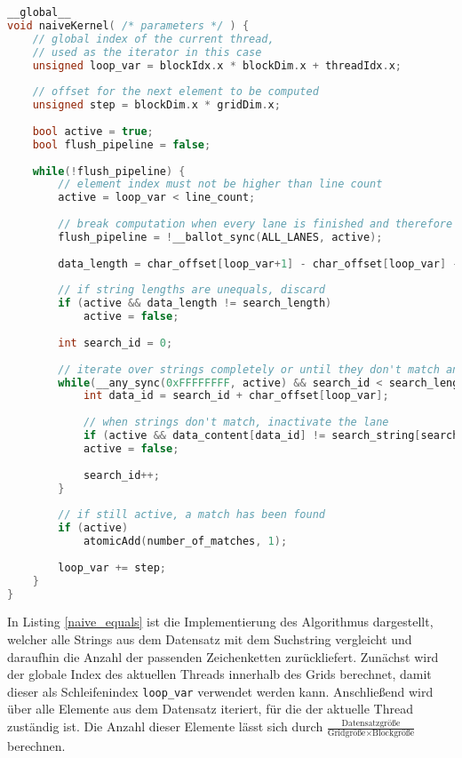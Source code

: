 \begin{lstlisting}[language=C++,
	caption=Naive Implementierung des String-Vergleichs,
	label=naive_equals]
__global__
void naiveKernel( /* parameters */ ) {
	// global index of the current thread,
	// used as the iterator in this case
	unsigned loop_var = blockIdx.x * blockDim.x + threadIdx.x;
	
	// offset for the next element to be computed
	unsigned step = blockDim.x * gridDim.x;
	
	bool active = true;
	bool flush_pipeline = false;
	
	while(!flush_pipeline) {
		// element index must not be higher than line count
		active = loop_var < line_count;
		
		// break computation when every lane is finished and therefore inactive
		flush_pipeline = !__ballot_sync(ALL_LANES, active);
		
		data_length = char_offset[loop_var+1] - char_offset[loop_var] - 1;
		
		// if string lengths are unequals, discard
		if (active && data_length != search_length)
			active = false;
		
		int search_id = 0;
		
		// iterate over strings completely or until they don't match anymore
		while(__any_sync(0xFFFFFFFF, active) && search_id < search_length) {
			int data_id = search_id + char_offset[loop_var];
			
			// when strings don't match, inactivate the lane
			if (active && data_content[data_id] != search_string[search_id])
			active = false;
			
			search_id++;
		}
		
		// if still active, a match has been found
		if (active)
			atomicAdd(number_of_matches, 1);
		
		loop_var += step;
	}
}
\end{lstlisting}

In Listing \ref{naive_equals} ist die Implementierung des Algorithmus dargestellt, welcher alle Strings aus dem Datensatz mit dem Suchstring vergleicht und daraufhin die Anzahl der passenden Zeichenketten zurückliefert.
Zunächst wird der globale Index des aktuellen Threads innerhalb des Grids berechnet, damit dieser als Schleifenindex \texttt{loop\_var} verwendet werden kann.
Anschließend wird über alle Elemente aus dem Datensatz iteriert, für die der aktuelle Thread zuständig ist.
Die Anzahl dieser Elemente lässt sich durch $\frac{\text{Datensatzgröße}}{\text{Gridgröße} \times \text{Blockgröße}}$ berechnen.

